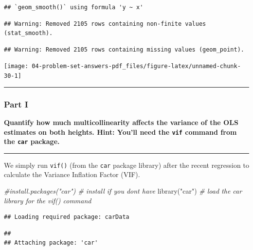 \documentclass[
]{article}
\newenvironment{Shaded}{\begin{snugshade}}{\end{snugshade}}
\newcommand{\CommentTok}[1]{\textcolor[rgb]{0.56,0.35,0.01}{\textit{#1}}}
\newcommand{\FunctionTok}[1]{\textcolor[rgb]{0.00,0.00,0.00}{#1}}
\newcommand{\NormalTok}[1]{#1}
\newcommand{\StringTok}[1]{\textcolor[rgb]{0.31,0.60,0.02}{#1}}
\begin{document}
\begin{verbatim}
## `geom_smooth()` using formula 'y ~ x'
\end{verbatim}

\begin{verbatim}
## Warning: Removed 2105 rows containing non-finite values (stat_smooth).
\end{verbatim}

\begin{verbatim}
## Warning: Removed 2105 rows containing missing values (geom_point).
\end{verbatim}

\texttt{[image: 04-problem-set-answers-pdf\_files/figure-latex/unnamed-chunk-30-1]}

\begin{center}\rule{0.5\linewidth}{0.5pt}\end{center}

\hypertarget{part-i-1}{%
\subsubsection{Part I}\label{part-i-1}}

\textbf{Quantify how much multicollinearity affects the variance of the
OLS estimates on both heights. Hint: You'll need the \texttt{vif}
command from the \texttt{car} package.}

\begin{center}\rule{0.5\linewidth}{0.5pt}\end{center}

We simply run \texttt{vif()} (from the \texttt{car} package library)
after the recent regression to calculate the Variance Inflation Factor
(VIF).

\begin{Shaded}
\begin{Highlighting}[]
\CommentTok{\#install.packages("car") \# install if you don\textquotesingle{}t have }
\FunctionTok{library}\NormalTok{(}\StringTok{"car"}\NormalTok{) }\CommentTok{\# load the car library for the vif() command}
\end{Highlighting}
\end{Shaded}

\begin{verbatim}
## Loading required package: carData
\end{verbatim}

\begin{verbatim}
## 
## Attaching package: 'car'
\end{verbatim}
\end{document}
